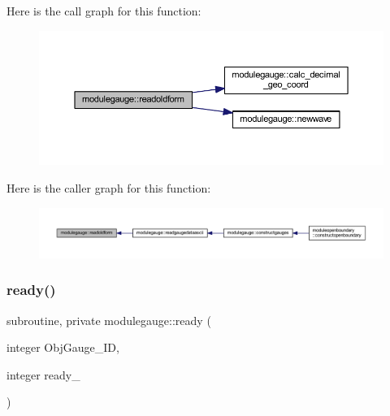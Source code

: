 Here is the call graph for this function\+:\nopagebreak
\begin{figure}[H]
\begin{center}
\leavevmode
\includegraphics[width=350pt]{namespacemodulegauge_a046651f5fe7a0df46688f6d3467b09b5_cgraph}
\end{center}
\end{figure}
Here is the caller graph for this function\+:\nopagebreak
\begin{figure}[H]
\begin{center}
\leavevmode
\includegraphics[width=350pt]{namespacemodulegauge_a046651f5fe7a0df46688f6d3467b09b5_icgraph}
\end{center}
\end{figure}
\mbox{\label{namespacemodulegauge_a8ece20a220d6beae6919846687d6fe8f}} 
\subsubsection{\texorpdfstring{ready()}{ready()}}
{\footnotesize\ttfamily subroutine, private modulegauge\+::ready (\begin{DoxyParamCaption}\item[{integer}]{Obj\+Gauge\+\_\+\+ID,  }\item[{integer}]{ready\+\_\+ }\end{DoxyParamCaption})\hspace{0.3cm}{\ttfamily [private]}}

